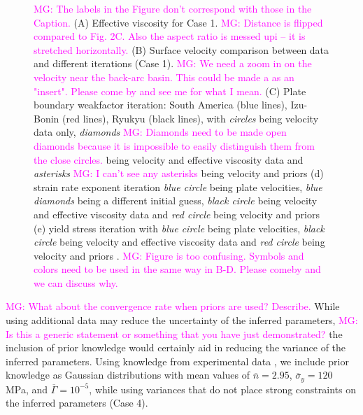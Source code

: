 \documentclass[12pt]{article}
\newcommand{\mgnote}[1]{\textcolor{magenta}{MG: #1}}
\begin{document}
{\begin{figure}[H]
\caption{\mgnote{The labels in the Figure don't correspond with those in the Caption.}
(A) Effective viscosity for Case 1. \mgnote{Distance is flipped compared to Fig. 2C. Also the aspect ratio is messed upi -- it is stretched horizontally.}
(B) Surface velocity comparison between data and different iterations (Case 1). \mgnote{We need a zoom in on the velocity near the back-arc basin. This could be made a as an "insert". Please come by and see me for what I mean.}
(C) Plate boundary weakfactor iteration: South America (blue lines), Izu-Bonin (red lines), Ryukyu (black lines), with \textit{circles} being velocity data only, \textit{diamonds} \mgnote{Diamonds need to be made open diamonds because it is impossible to easily distinguish them from the close circles.} being velocity and effective viscosity data and \textit{asterisks} \mgnote{I can't see any asterisks} being velocity and priors  (d) strain rate exponent iteration \textit{blue circle} being plate velocities, \textit{blue diamonds} being a different initial guess, \textit{black circle} being velocity and effective viscosity data and \textit{red circle} being velocity and priors (e) yield stress iteration with \textit{blue circle} being plate velocities, \textit{black circle} being velocity and effective viscosity data and \textit{red circle} being velocity and priors .
\mgnote{Figure is too confusing. Symbols and colors need to be used in the same way in B-D. Please comeby and we can discuss why.}
}
\label{fig:inverse1}
\end{figure}

\mgnote{What about the convergence rate when priors are used? Describe.}
While using additional data may reduce the uncertainty of the inferred parameters, 
\mgnote{Is this a generic statement or something that you have just demonstrated?}
the inclusion of prior knowledge would certainly aid in reducing the variance of the inferred parameters. Using knowledge from experimental data \citep{korenaga2008new}, we include prior knowledge as Gaussian distributions with mean values of $\overline{n}=2.95$, $\overline{\sigma}_y = 120$ MPa, and $\overline{\Gamma}=10^{-5}$, while using variances that do not place strong constraints on the inferred parameters (Case 4). 


\begin{figure}[H]
\centering

\hspace{-1.0cm}\subfigure{
}


\end{figure}}
\end{document}

